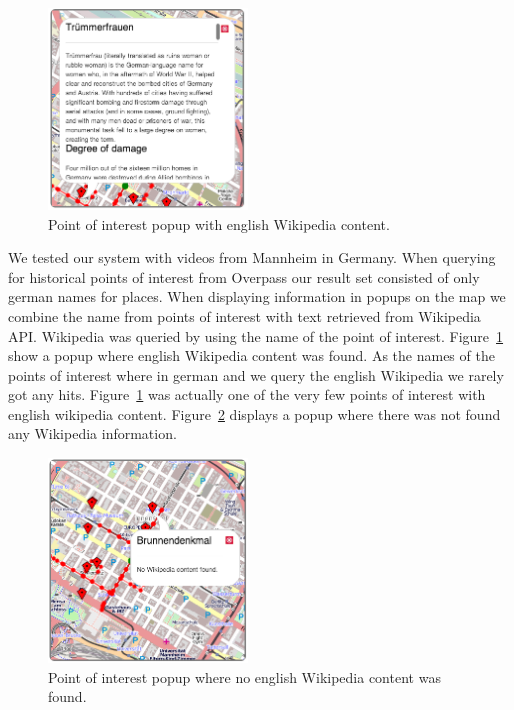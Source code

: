 \documentclass[journal]{IEEEtran}
\begin{document}
        \begin{figure}[htb]
         \centering
         \includegraphics[width=200px]{popup_with_content}
         \caption{Point of interest popup with english Wikipedia content.}
         \label{popup_with_content}
        \end{figure}


We tested our system with videos from Mannheim in Germany. When querying for historical points of interest from Overpass\cite{overpass} our result set consisted of only german names for places. When displaying information in popups on the map we combine the name from points of interest with text retrieved from Wikipedia API\cite{wikiapi}. Wikipedia was queried by using the name of the point of interest. Figure~\ref{popup_with_content} show a popup where english Wikipedia content was found. As the names of the points of interest where in german and we query the english Wikipedia we rarely got any hits. Figure~\ref{popup_with_content} was actually one of the very few points of interest with english wikipedia content. Figure~\ref{popup_wo_content} displays a popup where there was not found any Wikipedia information.

        \begin{figure}[htb]
         \centering
         \includegraphics[width=200px]{popup_wo_content}
         \caption{Point of interest popup where no english Wikipedia content was found.}
         \label{popup_wo_content}
        \end{figure}
\end{document}
